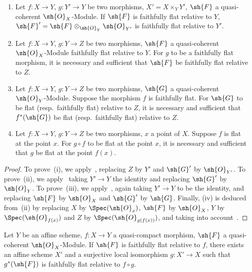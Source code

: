 \begin{corollary}[2.2.11]
\label{IV.2.2.11}
\medskip\noindent
\begin{enumerate}
  \item[\textnormal{(i)}] Let $f:X\to Y$, $g:Y'\to Y$ be two morphisms, $X'=X\times_Y Y'$, $\sh{F}$ a quasi-coherent $\sh{O}_X$-Module. If $\sh{F}$ is faithfully flat relative to $Y$, $\sh{F}'=\sh{F}\otimes_{\sh{O}_Y}\sh{O}_{Y'}$ is faithfully flat relative to $Y'$.
  \item[\textnormal{(ii)}] Let $f:X\to Y$, $g:Y\to Z$ be two morphisms, $\sh{F}$ a quasi-coherent $\sh{O}_X$-Module faithfully flat relative to $Y$.
    For $g$ to be a faithfully flat morphism, it is necessary and sufficient that $\sh{F}$ be faithfully flat relative to $Z$.
  \item[\textnormal{(iii)}] Let $f:X\to Y$, $g:Y\to Z$ be two morphisms, $\sh{G}$ a quasi-coherent $\sh{O}_Y$-Module.
    Suppose the morphism $f$ is faithfully flat.
    For $\sh{G}$ to be flat \textnormal{(}resp.\ faithfully flat\textnormal{)} relative to $Z$, it is necessary and sufficient that $f^*(\sh{G})$ be flat \textnormal{(}resp.\ faithfully flat\textnormal{)} relative to $Z$.
  \item[\textnormal{(iv)}] Let $f:X\to Y$, $g:Y\to Z$ be two morphisms, $x$ a point of $X$.
    Suppose $f$ is flat at the point $x$. For $g\circ f$ to be flat at the point $x$, it is necessary and sufficient that $g$ be flat at the point $f(x)$.
\end{enumerate}
\end{corollary}

\begin{proof}
To prove~(i), we apply~, replacing $Z$ by $Y'$ and $\sh{G}'$ by $\sh{O}_{Y'}$.
To prove~(ii), we apply~ taking $Y'\to Y$ the identity and replacing $\sh{G}'$ by $\sh{O}_Y$.
To prove~(iii), we apply~, again taking $Y'\to Y$ to be the identity, and replacing $\sh{F}$ by $\sh{O}_X$ and $\sh{G}'$ by $\sh{G}$.
Finally, (iv) is deduced from~(ii) by replacing $X$ by $\Spec(\sh{O}_x)$, $\sh{F}$ by $\sh{O}_X$, $Y$ by $\Spec(\sh{O}_{f(x)})$ and $Z$ by $\Spec(\sh{O}_{g(f(x))})$, and taking into account~.
\end{proof}

\begin{corollary}[2.2.12]
\label{IV.2.2.12}
Let $Y$ be an affine scheme, $f:X\to Y$ a quasi-compact morphism,
$\sh{F}$ a quasi-coherent $\sh{O}_X$-Module.
If $\sh{F}$ is faithfully flat relative to $f$, there exists an affine scheme $X'$ and a surjective local isomorphism $g:X'\to X$ such that $g^*(\sh{F})$ is faithfully flat relative to $f\circ g$.
\end{corollary}

